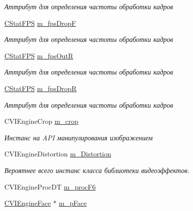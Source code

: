 \begin{DoxyCompactItemize}
\begin{DoxyCompactList}\small\item\em Аттрибут для определения частоты обработки кадров \end{DoxyCompactList}\item 
\hyperlink{class_c_stat_f_p_s}{C\+Stat\+F\+P\+S} \hyperlink{class_c_v_i_engine_base_afe15eeaa45219bf0b4c4ffbf08887d4a}{m\+\_\+fps\+Drop\+F}
\begin{DoxyCompactList}\small\item\em Аттрибут для определения частоты обработки кадров \end{DoxyCompactList}\item 
\hyperlink{class_c_stat_f_p_s}{C\+Stat\+F\+P\+S} \hyperlink{class_c_v_i_engine_base_a2ad39d8c6557ef3c0dd6fb9dc376c8b5}{m\+\_\+fps\+Out\+R}
\begin{DoxyCompactList}\small\item\em Аттрибут для определения частоты обработки кадров \end{DoxyCompactList}\item 
\hyperlink{class_c_stat_f_p_s}{C\+Stat\+F\+P\+S} \hyperlink{class_c_v_i_engine_base_a3bd5b977e29332c55f1eaf9a1192d03a}{m\+\_\+fps\+Drop\+R}
\begin{DoxyCompactList}\small\item\em Аттрибут для определения частоты обработки кадров \end{DoxyCompactList}\item 
C\+V\+I\+Engine\+Crop \hyperlink{class_c_v_i_engine_base_a914dcdad5bb4fa5d7c0363122aa5fa0b}{m\+\_\+crop}
\begin{DoxyCompactList}\small\item\em Инстанс на A\+P\+I манипулирования изображением \end{DoxyCompactList}\item 
C\+V\+I\+Engine\+Distortion \hyperlink{class_c_v_i_engine_base_a5f19c0757146848a5e16bbe1a2a8d6f9}{m\+\_\+\+Distortion}
\begin{DoxyCompactList}\small\item\em Вероятнее всего инстанс класса библиотеки видеоэффектов. \end{DoxyCompactList}\item 
C\+V\+I\+Engine\+Proc\+D\+T \hyperlink{class_c_v_i_engine_base_af130df6a0fc2f75aeea417af333755a2}{m\+\_\+proc\+F6}
\item 
\hyperlink{class_c_v_i_engine_face}{C\+V\+I\+Engine\+Face} $\ast$ \hyperlink{class_c_v_i_engine_base_a67ce30a4c5018bdb7d33725094454166}{m\+\_\+p\+Face}

\end{DoxyCompactItemize}

